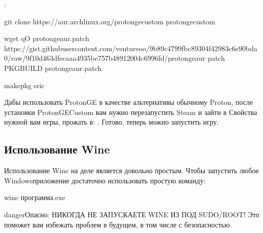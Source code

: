 \documentclass[letterpaper,10pt,russian,openany]{sphinxmanual}
\begin{document}
\sphinxAtStartPar
{}:

\begin{sphinxVerbatim}[commandchars=\\\{\}]
git clone https://aur.archlinux.org/proton\PYGZhy{}ge\PYGZhy{}custom
 proton\PYGZhy{}ge\PYGZhy{}custom

wget \PYGZhy{}qO proton\PYGZhy{}ge\PYGZhy{}aur.patch https://gist.githubusercontent.com/ventureoo/9b89c4799fbc89304f42983c6e90bda0/raw/9f10d463dfecaaa4935be757b48912004c6996fd/proton\PYGZhy{}ge\PYGZhy{}aur
patch PKGBUILD proton\PYGZhy{}ge\PYGZhy{}aur.patch

makepkg \PYGZhy{}sric
\end{sphinxVerbatim}

\sphinxAtStartPar
Дабы использовать Proton\sphinxhyphen{}GE в качестве альтернативы обычному Proton,
после установки Proton\sphinxhyphen{}GE\sphinxhyphen{}Custom вам нужно перезапустить Steam и зайти в Свойства нужной вам игры, прожать в:
. Готово, теперь можно запустить игру.

\ignorespaces 

\subsection{Использование Wine}
\label{\detokenize{source/linux-gaming:wine-usage}}\label{\detokenize{source/linux-gaming:index-8}}\label{\detokenize{source/linux-gaming:id8}}
\sphinxAtStartPar
Использование Wine на деле является довольно простым.
Чтобы запустить любое Windows\sphinxhyphen{}приложение достаточно использовать простую команду:

\begin{sphinxVerbatim}[commandchars=\\\{\}]
wine программа.exe
\end{sphinxVerbatim}

\begin{sphinxadmonition}{danger}{Опасно:}
\sphinxAtStartPar
НИКОГДА НЕ ЗАПУСКАЕТЕ WINE ИЗ ПОД SUDO/ROOT! Это поможет вам избежать проблем в будущем, в том числе с безопасностью.
\end{sphinxadmonition}
\end{document}
